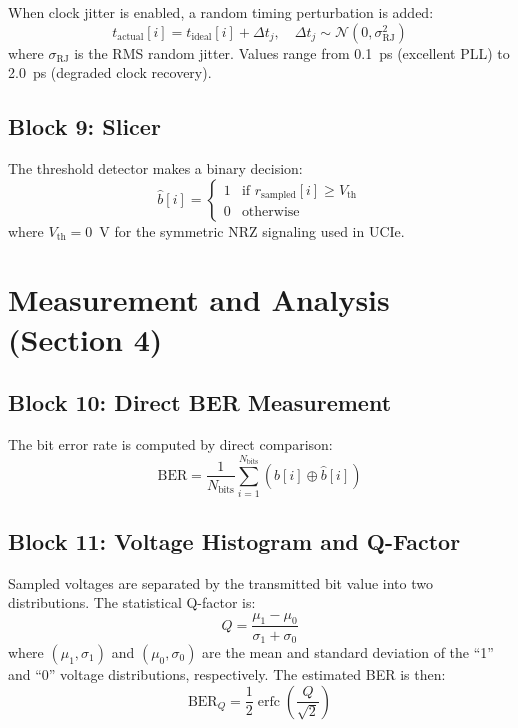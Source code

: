 \documentclass[conference]{IEEEtran}
\begin{document}
When clock jitter is enabled, a random timing perturbation is added:
\begin{equation}
    t_{\text{actual}}[i] = t_{\text{ideal}}[i] + \Delta t_j, \quad \Delta t_j \sim \mathcal{N}(0, \sigma_{\text{RJ}}^2)
\end{equation}
where $\sigma_{\text{RJ}}$ is the RMS random jitter. Values range from 0.1~ps (excellent PLL) to 2.0~ps (degraded clock recovery).

\subsection{Block 9: Slicer}

The threshold detector makes a binary decision:
\begin{equation}
    \hat{b}[i] = \begin{cases} 1 & \text{if } r_{\text{sampled}}[i] \geq V_{\text{th}} \\ 0 & \text{otherwise} \end{cases}
\end{equation}
where $V_{\text{th}} = 0$~V for the symmetric NRZ signaling used in UCIe.

\section{Measurement and Analysis (Section 4)}

\subsection{Block 10: Direct BER Measurement}

The bit error rate is computed by direct comparison:
\begin{equation}
    \text{BER} = \frac{1}{N_{\text{bits}}} \sum_{i=1}^{N_{\text{bits}}} \left( b[i] \oplus \hat{b}[i] \right)
\end{equation}

\subsection{Block 11: Voltage Histogram and Q-Factor}

Sampled voltages are separated by the transmitted bit value into two distributions. The statistical Q-factor is:
\begin{equation}
    Q = \frac{\mu_1 - \mu_0}{\sigma_1 + \sigma_0}
\end{equation}
where $(\mu_1, \sigma_1)$ and $(\mu_0, \sigma_0)$ are the mean and standard deviation of the ``1'' and ``0'' voltage distributions, respectively. The estimated BER is then:
\begin{equation}
    \text{BER}_Q = \frac{1}{2} \operatorname{erfc}\!\left(\frac{Q}{\sqrt{2}}\right)
\end{equation}
\end{document}
